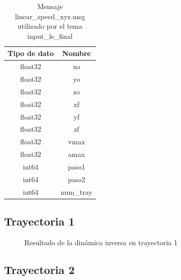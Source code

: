            \begingroup
            \renewcommand{\arraystretch}{1.0}
            \begin{table}[H]
                \centering
                \begin{tabular}{c c}
                   \hline                   
                   \textbf{Tipo de dato}  & \textbf{Nombre}    \\\hline \hline 
                    float32 & xo
                   \\\hline
                    float32 & yo
                   \\\hline
                    float32 & zo
                   \\\hline
                    float32 & xf
                   \\\hline
                    float32 & yf
                   \\\hline
                    float32 & zf
                   \\\hline
                    float32 & vmax
                   \\\hline
                    float32 & amax
                   \\\hline
                    int64 & paso1
                   \\\hline
                    int64 & paso2
                   \\\hline
                    int64 & num\_tray
                    \\\hline                   
                \end{tabular}
                \caption{Mensaje linear\_speed\_xyz.msg utilizado por el tema input\_ls\_final}
                \label{tab:cap6_rviz_5_msg}
            \end{table}
        \endgroup   
        \newpage

    \subsection{Trayectoria 1}
    
        \begin{figure}[h]
            \centering
            
            \caption{Resultado de la dinámica inversa en trayectoria 1}
            \label{f:cap7_tray1}
        \end{figure}

                
    \subsection{Trayectoria 2}
    
